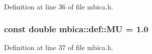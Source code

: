 Definition at line 36 of file mbica.h.

\hypertarget{namespacembica_1_1def_a060dcd264ce55c7a950c066dcf7d0a34}{
\subsubsection[{MU}]{\setlength{\rightskip}{0pt plus 5cm}const double {\bf mbica::def::MU} = 1.0}}
\label{namespacembica_1_1def_a060dcd264ce55c7a950c066dcf7d0a34}


Definition at line 37 of file mbica.h.

